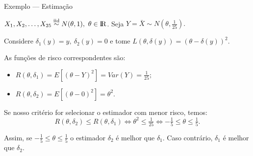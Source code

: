 \documentclass[12pt]{beamer}
\begin{document}
\begin{frame}{Exemplo — Estimação}
	\begin{block}{}
		\justifying
		$X_1, X_2, \ldots, X_{25}\overset{\text{iid}}{\sim} N(\theta, 1), ~ \theta \in \rm I\!R$. Seja $Y = \bar{X}\sim N(\theta, \tfrac{1}{25}).$ 
		
		Considere $\delta_1(y) = y, ~\delta_2(y) = 0$ e tome 
		$L(\theta, \delta(y)) = (\theta - \delta(y))^2.$ 
		
		As funções de risco correspondentes são:
		\begin{itemize}
			\item $R(\theta, \delta_1) = E[(\theta - Y)^2] = Var(Y) = \tfrac{1}{25};$
			\item $R(\theta, \delta_2) = E[(\theta - 0)^2] = \theta^2$.
		\end{itemize}
	\end{block}
	\pause
	\begin{block}{}
		\justifying
		Se nosso critério for selecionar o estimador com menor risco, temos:
		\[
		R(\theta, \delta_2)\leq R(\theta, \delta_1) 
		\iff \theta^2\leq \tfrac{1}{25}
		\iff -\tfrac{1}{5}\leq \theta \leq \tfrac{1}{5}.
		\]
	\end{block}
	\pause
	\begin{block}{}
		\justifying
		Assim, se $-\tfrac{1}{5}\leq \theta \leq \tfrac{1}{5}$ o estimador $\delta_{2}$ é melhor que $\delta_{1}$. 
		Caso contrário, $\delta_{1}$ é melhor que $\delta_{2}$.
	\end{block}
\end{frame}
\end{document}
